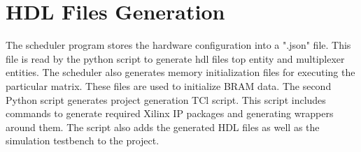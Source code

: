 \section{HDL Files Generation}
The scheduler program stores the hardware configuration into a ".json" file. This file is read by the 
python script to generate hdl files top entity and multiplexer entities. The scheduler also 
generates memory initialization files for executing the particular matrix. These files are 
used to initialize BRAM data. The second Python script generates project generation 
TCl script. This script includes commands to generate required Xilinx IP packages and 
generating wrappers around them. The script also adds the generated HDL files as well as the simulation 
testbench to the project.

